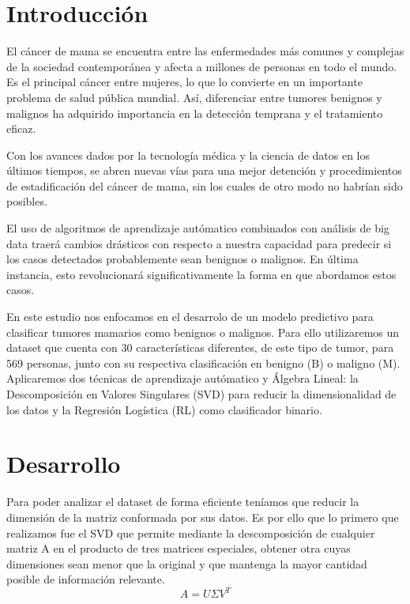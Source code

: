 \documentclass[a4paper,10pt,twocolumn]{article}
\begin{document}
\section{Introducción}\label{sec:intro}
  El cáncer de mama se encuentra entre las enfermedades más comunes y complejas de la sociedad contemporánea y afecta a millones de personas en todo el mundo. Es el principal cáncer entre mujeres, lo que lo convierte en un importante problema de salud pública mundial. Así, diferenciar entre tumores benignos y malignos ha adquirido importancia en la detección temprana y el tratamiento eficaz.

Con los avances dados por la tecnología médica y la ciencia de datos en los últimos tiempos, se abren nuevas vías para una mejor detención y procedimientos de estadificación del cáncer de mama, sin los cuales de otro modo no habrían sido posibles.

El uso de algoritmos de aprendizaje autómatico combinados con análisis de big data traerá cambios drásticos con respecto a nuestra capacidad para predecir si los casos detectados probablemente sean benignos o malignos. En última instancia, esto revolucionará significativamente la forma en que abordamos estos casos.

En este estudio nos enfocamos en el desarrolo de un modelo predictivo para clasificar tumores mamarios como benignos o malignos. Para ello utilizaremos un dataset que cuenta con 30 características diferentes, de este tipo de tumor, para 569 personas, junto con su respectiva clasificación en benigno (B) o maligno (M). Aplicaremos dos técnicas de aprendizaje autómatico y Álgebra Lineal: la Descomposición en Valores Singulares (SVD) para reducir la dimensionalidad de los datos y la Regresión Logística (RL) como clasificador binario.




\section{Desarrollo}\label{sec:dev}
  Para poder analizar el dataset de forma eficiente teníamos que reducir la dimensión de la matriz conformada por sus datos. Es por ello que lo primero que realizamos fue el SVD que permite mediante la descomposición de cualquier matriz A en el producto de tres matrices especiales, obtener otra cuyas dimensiones sean menor que la original y que mantenga la mayor cantidad posible de información relevante.
\[
    A = U \Sigma V^T
\]
\end{document}
